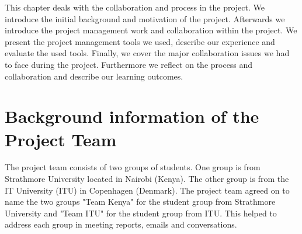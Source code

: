 This chapter deals with the collaboration and process in the project. We introduce the initial background and motivation of the project. Afterwards we introduce the project management work and collaboration within the project. We present the project management tools we used, describe our experience and evaluate the used tools.
Finally, we cover the major collaboration issues we had to face during the project. Furthermore we reflect on the process and collaboration and describe our learning outcomes.











\section{Background information of the Project Team}
The project team consists of two groups of students. One group is from Strathmore University located in Nairobi (Kenya). The other group is from the IT University (ITU) in Copenhagen (Denmark). The project team agreed on to name the two groups "Team Kenya" for the student group from Strathmore University and "Team ITU" for the student group from ITU. This helped to address each group in meeting reports, emails and conversations.

